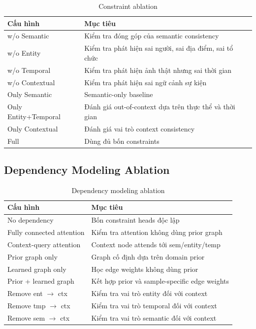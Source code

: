 \documentclass[11pt,a4paper]{article}
\begin{document}
\begin{table}[H]
\centering
\caption{Constraint ablation}
\begin{tabularx}{\linewidth}{lX}
\toprule
\textbf{Cấu hình} & \textbf{Mục tiêu}\\
\midrule
w/o Semantic & Kiểm tra đóng góp của semantic consistency\\
w/o Entity & Kiểm tra phát hiện sai người, sai địa điểm, sai tổ chức\\
w/o Temporal & Kiểm tra phát hiện ảnh thật nhưng sai thời gian\\
w/o Contextual & Kiểm tra phát hiện sai ngữ cảnh sự kiện\\
Only Semantic & Semantic-only baseline\\
Only Entity+Temporal & Đánh giá out-of-context dựa trên thực thể và thời gian\\
Only Contextual & Đánh giá vai trò context consistency\\
Full & Dùng đủ bốn constraints\\
\bottomrule
\end{tabularx}
\end{table}

\subsection{Dependency Modeling Ablation}

\begin{table}[H]
\centering
\caption{Dependency modeling ablation}
\begin{tabularx}{\linewidth}{lX}
\toprule
\textbf{Cấu hình} & \textbf{Mục tiêu}\\
\midrule
No dependency & Bốn constraint heads độc lập\\
Fully connected attention & Kiểm tra attention không dùng prior graph\\
Context-query attention & Context node attends tới sem/entity/temp\\
Prior graph only & Graph cố định dựa trên domain prior\\
Learned graph only & Học edge weights không dùng prior\\
Prior + learned graph & Kết hợp prior và sample-specific edge weights\\
Remove ent $\rightarrow$ ctx & Kiểm tra vai trò entity đối với context\\
Remove tmp $\rightarrow$ ctx & Kiểm tra vai trò temporal đối với context\\
Remove sem $\rightarrow$ ctx & Kiểm tra vai trò semantic đối với context\\
\bottomrule
\end{tabularx}
\end{table}
\end{document}
